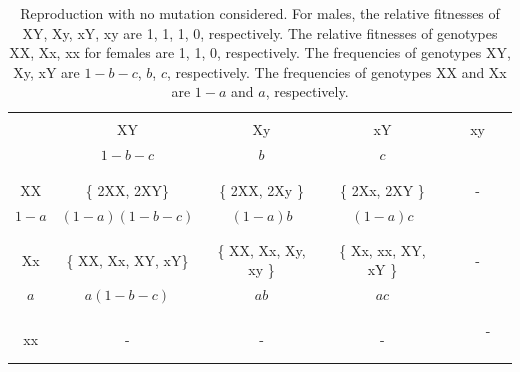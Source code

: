 \documentclass[referee,sn-basic]{sn-jnl}%
\theoremstyle{thmstyleone}%
\theoremstyle{thmstyletwo}%
\theoremstyle{thmstylethree}%
\begin{document}
\begin{table}[]
	\caption{
Reproduction with no mutation considered. For males, the relative fitnesses of XY, Xy, xY, xy are 1, 1, 1, 0, respectively. The relative fitnesses of genotypes XX, Xx, xx for females are 1, 1, 0, respectively. The frequencies of genotypes XY, Xy, xY are $1\!-b-c$, $b$, $c$, respectively. The frequencies of genotypes XX and Xx are $1\!-a$ and $a$, respectively.
\label{XY}
	}
	\begin{center}
		\begin{tabular}{ c!{\vrule width 1pt}c|c|c|c }
			\hline
			\vspace{-2mm}
			&     &     &     &     \\
			& XY    & Xy    & xY    & xy    \\
			& $1\!-\!b\!-\!c$ & $b$     & $c$     &       \\
			\vspace{-3mm} &     &     &     &     \\
			\vspace{-2mm}
			&     &     &     &     \\
			XX      & \{ 2XX, 2XY\} & \{ 2XX, 2Xy \}        & \{ 2Xx, 2XY \}        &-      \\
			$1\!-\!a$     & $(1\!-\!a)(1\!-\!b\!-\!c)$  & $(1\!-\!a)b$                & $(1\!-\!a)c$                &       \\
			\vspace{-3mm} &     &     &     &     \\
			\hline
			\vspace{-2mm}
			&     &     &     &     \\
			Xx      & \{ XX, Xx, XY, xY\}   & \{ XX, Xx, Xy, xy \}  & \{ Xx, xx, XY, xY \}  &-      \\
			$a$       & $a(1\!-\!b\!-\!c)$      & $ab$            & $ac$            &       \\
			\vspace{-3mm} &     &     &     &     \\
			\hline
			\vspace{-2mm}
			&     &     &     &     \\
			xx      & -     & -     & -     &\ \ \  -\  \ \ \ \        \\
			\hline
		\end{tabular}
	\end{center}
\end{table}
\end{document}

